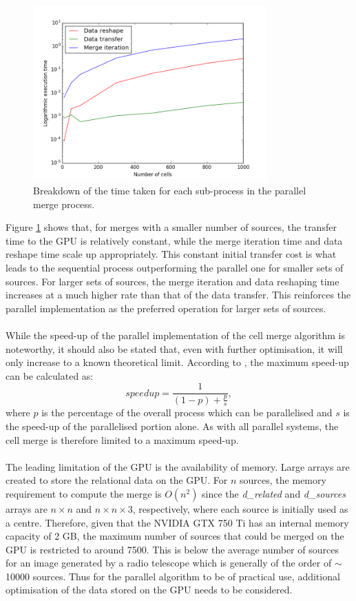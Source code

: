 \begin{figure}[H]
\centering
\includegraphics[width=0.8\textwidth]{Images/result_profile.png}
\caption{Breakdown of the time taken for each sub-process in the parallel merge process.}
\label{res:fig:prof}
\end{figure}
Figure \ref{res:fig:prof} shows that, for merges with a smaller number of sources, the transfer time to the GPU is relatively constant, while the merge iteration time and data reshape time scale up appropriately. This constant initial transfer cost is what leads to the sequential process outperforming the parallel one for smaller sets of sources. For larger sets of sources, the merge iteration and data reshaping time increases at a much higher rate than that of the data transfer.  This reinforces the parallel implementation as the preferred operation for larger sets of sources.
\\
\\
While the speed-up of the parallel implementation of the cell merge algorithm is noteworthy, it should also be stated that, even with further optimisation, it will only increase to a known theoretical limit. According to \citet{amdahl1967validity}, the maximum speed-up can be calculated as:
\begin{equation}
	speedup = \frac{1}{(1-p)+\frac{p}{s}},
\end{equation}
where $p$ is the percentage of the overall process which can be parallelised and $s$ is the speed-up of the parallelised portion alone. As with all parallel systems, the cell merge is therefore limited to a maximum speed-up.
\\
\\
The leading limitation of the GPU is the availability of memory. Large arrays are created to store the relational data on the GPU. For $n$ sources, the memory requirement to compute the merge is $O(n^2)$ since the \textit{d\_related} and \textit{d\_sources} arrays are $n \times n$ and $n \times n \times 3$, respectively, where each source is initially used as a centre. Therefore, given that the NVIDIA GTX 750 Ti has an internal memory capacity of 2 GB, the maximum number of sources that could be merged on the GPU is restricted to around 7500. This is below the average number of sources for an image generated by a radio telescope which is generally of the order of $\sim$10000 sources. Thus for the parallel algorithm to be of practical use, additional optimisation of the data stored on the GPU needs to be considered.